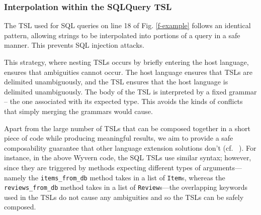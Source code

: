 \subsubsection{Interpolation within the SQLQuery TSL} The TSL used for SQL queries on line 18 of Fig. \ref{f-example} follows an identical pattern, allowing strings to be interpolated into portions of a query in a safe manner. This prevents SQL injection attacks.

 This strategy, where nesting TSLs occurs by briefly entering the host language, ensures that ambiguities cannot occur. The host language ensures that TSLs are delimited unambiguously, and the TSL ensures that the host language is delimited unambiguously. The body of the TSL is interpreted by a fixed grammar -- the one associated with its expected type. This avoids the kinds of conflicts that simply merging the grammars would cause. %

Apart from the large number of TSLs that can be composed together in a short
piece of code while producing meaningful results, we aim to provide a safe
composability guarantee that other language extension solutions don't
(cf.~\cite{Erdweg:2013:FEL:2517208.2517210} ).
For instance, in the above Wyvern code, the SQL TSLs use similar syntax;
however, since they are triggered by methods expecting different types of
arguments---namely the \lstinline{items_from_db} method takes in a list of
\lstinline{Item}s, whereas the \lstinline{reviews_from_db} method takes in a list of
\lstinline{Review}s---the overlapping keywords used in the TSLs do not cause any
ambiguities and so the TSLs can be safely composed.

